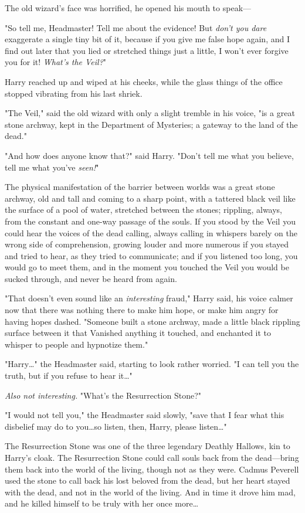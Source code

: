 The old wizard’s face was horrified, he opened his mouth to speak—

"So tell me, Headmaster! Tell me about the evidence! But \emph{don’t you dare}
exaggerate a single tiny bit of it, because if you give me false hope again,
and I find out later that you lied or stretched things just a little, I won’t
ever forgive you for it! \emph{What’s the Veil?}"

Harry reached up and wiped at his cheeks, while the glass things of the office
stopped vibrating from his last shriek.

"The Veil," said the old wizard with only a slight tremble in his voice, "is a
great stone archway, kept in the Department of Mysteries; a gateway to the land
of the dead."

"And how does anyone know that?" said Harry. "Don’t tell me what you believe,
tell me what you’ve \emph{seen!}"

The physical manifestation of the barrier between worlds was a great stone
archway, old and tall and coming to a sharp point, with a tattered black veil
like the surface of a pool of water, stretched between the stones; rippling,
always, from the constant and one-way passage of the souls. If you stood by the
Veil you could hear the voices of the dead calling, always calling in whispers
barely on the wrong side of comprehension, growing louder and more numerous if
you stayed and tried to hear, as they tried to communicate; and if you listened
too long, you would go to meet them, and in the moment you touched the Veil you
would be sucked through, and never be heard from again.

"That doesn’t even sound like an \emph{interesting} fraud," Harry said, his
voice calmer now that there was nothing there to make him hope, or make him
angry for having hopes dashed. "Someone built a stone archway, made a little
black rippling surface between it that Vanished anything it touched, and
enchanted it to whisper to people and hypnotize them."

"Harry…" the Headmaster said, starting to look rather worried. "I can
tell you the truth, but if you refuse to hear it…"

\emph{Also not interesting.} "What’s the Resurrection Stone?"

"I would not tell you," the Headmaster said slowly, "save that I fear what this
disbelief may do to you…so listen, then, Harry, please listen…"

The Resurrection Stone was one of the three legendary Deathly Hallows, kin to
Harry’s cloak. The Resurrection Stone could call souls back from the
dead—bring them back into the world of the living, though not as they were.
Cadmus Peverell used the stone to call back his lost beloved from the dead, but
her heart stayed with the dead, and not in the world of the living. And in time
it drove him mad, and he killed himself to be truly with her once more…

